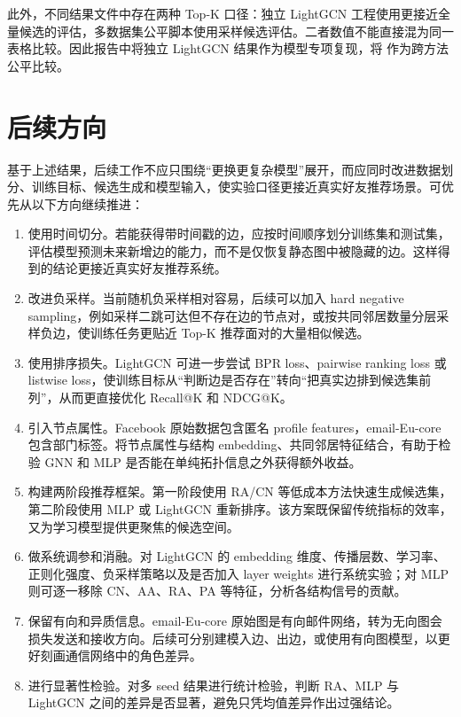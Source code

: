 \documentclass[UTF8,zihao=-4]{ctexart}
\begin{document}
此外，不同结果文件中存在两种 Top-K 口径：独立 LightGCN 工程使用更接近全量候选的评估，多数据集公平脚本使用采样候选评估。二者数值不能直接混为同一表格比较。因此报告中将独立 LightGCN 结果作为模型专项复现，将  作为跨方法公平比较。

\section{后续方向}

基于上述结果，后续工作不应只围绕“更换更复杂模型”展开，而应同时改进数据划分、训练目标、候选生成和模型输入，使实验口径更接近真实好友推荐场景。可优先从以下方向继续推进：

\begin{enumerate}
  \item 使用时间切分。若能获得带时间戳的边，应按时间顺序划分训练集和测试集，评估模型预测未来新增边的能力，而不是仅恢复静态图中被隐藏的边。这样得到的结论更接近真实好友推荐系统。
  \item 改进负采样。当前随机负采样相对容易，后续可以加入 hard negative sampling，例如采样二跳可达但不存在边的节点对，或按共同邻居数量分层采样负边，使训练任务更贴近 Top-K 推荐面对的大量相似候选。
  \item 使用排序损失。LightGCN 可进一步尝试 BPR loss、pairwise ranking loss 或 listwise loss，使训练目标从“判断边是否存在”转向“把真实边排到候选集前列”，从而更直接优化 Recall@K 和 NDCG@K。
  \item 引入节点属性。Facebook 原始数据包含匿名 profile features，email-Eu-core 包含部门标签。将节点属性与结构 embedding、共同邻居特征结合，有助于检验 GNN 和 MLP 是否能在单纯拓扑信息之外获得额外收益。
  \item 构建两阶段推荐框架。第一阶段使用 RA/CN 等低成本方法快速生成候选集，第二阶段使用 MLP 或 LightGCN 重新排序。该方案既保留传统指标的效率，又为学习模型提供更聚焦的候选空间。
  \item 做系统调参和消融。对 LightGCN 的 embedding 维度、传播层数、学习率、正则化强度、负采样策略以及是否加入 layer weights 进行系统实验；对 MLP 则可逐一移除 CN、AA、RA、PA 等特征，分析各结构信号的贡献。
  \item 保留有向和异质信息。email-Eu-core 原始图是有向邮件网络，转为无向图会损失发送和接收方向。后续可分别建模入边、出边，或使用有向图模型，以更好刻画通信网络中的角色差异。
  \item 进行显著性检验。对多 seed 结果进行统计检验，判断 RA、MLP 与 LightGCN 之间的差异是否显著，避免只凭均值差异作出过强结论。
\end{enumerate}
\end{document}
